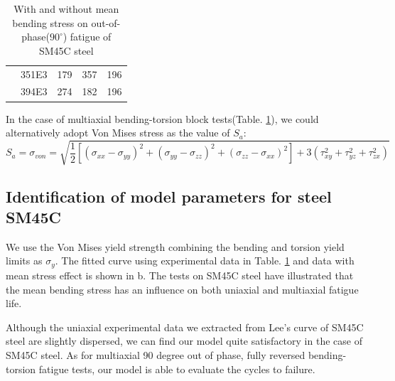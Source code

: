 \begin{table}[!h]
\begin{tabularx}{\textwidth}{XXXXX}
& 351E3                                                                                 & 179                                                                                       & 357                                                                                         & 196                                                                                         \\
& 394E3                                                                                 & 274                                                                                       & 182                                                                                         & 196                                                                                         \\ \hline
\end{tabularx}
\caption{With and without mean bending stress on out-of-phase($90^\circ$) fatigue of SM45C steel \cite{lee2013out}}
\label{meanSM45C}
\end{table}

In the case of multiaxial bending-torsion block tests(Table. \ref{meanSM45C}), we could alternatively adopt Von Mises stress as the value of $S_{a}$:
\begin{equation}
S_{a}=\sigma_{von}=\sqrt{\frac{1}{2}\left[ (\sigma_{xx}-\sigma_{yy})^2+(\sigma_{yy}-\sigma_{zz})^2+(\sigma_{zz}-\sigma_{xx})^2\right]+3(\tau_{xy}^2+\tau_{yz}^2+\tau_{zx}^2) }
\label{von}
\end{equation}

\newpage
\subsection{Identification of model parameters for steel SM45C}

We use the Von Mises yield strength combining the bending and torsion yield limits as $\sigma_y$. The fitted curve using experimental data in Table. \ref{meanSM45C} and data with mean stress effect is shown in b.
The tests on SM45C steel have illustrated that the mean bending stress has an influence on both uniaxial and multiaxial fatigue life. 

Although the uniaxial experimental data we extracted from Lee's curve \cite{lee2013out} of SM45C steel are slightly dispersed, we can find our model quite satisfactory in the case of SM45C steel. As for multiaxial 90 degree out of phase, fully reversed bending-torsion fatigue tests, our model is able to evaluate the cycles to failure.

